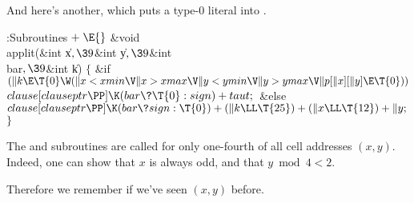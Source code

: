 And here's another, which puts a type-0 literal into .

\Y\B\4:Subroutines\X${}\mathrel+\E{}$\6
\&{void} \\{applit}(\&{int} \|x${},\39{}$\&{int} \|y${},\39{}$\&{int} %
\\{bar}${},\39{}$\&{int} \|k)\1\1\2\2\6
${}\{{}$\1\6
\&{if} ${}(\|k\E\T{0}\W(\|x<\\{xmin}\V\|x>\\{xmax}\V\|y<\\{ymin}\V\|y>\\{ymax}%
\V\|p[\|x][\|y]\E\T{0})){}$\1\5
${}\\{clause}[\\{clauseptr}\PP]\K(\\{bar}\?\T{0}:\\{sign})+\\{taut};{}$\2\6
\&{else}\1\5
${}\\{clause}[\\{clauseptr}\PP]\K(\\{bar}\?\\{sign}:\T{0})+(\|k\LL\T{25})+(\|x%
\LL\T{12})+\|y;{}$\2\6
\4${}\}{}$\2\par
\fi

The  and  subroutines are called for only one-fourth
of all cell addresses $(x,y)$. Indeed, one can show that
$x$ is always odd, and that $y\bmod4<2$.

Therefore we remember if we've seen $(x,y)$ before.

